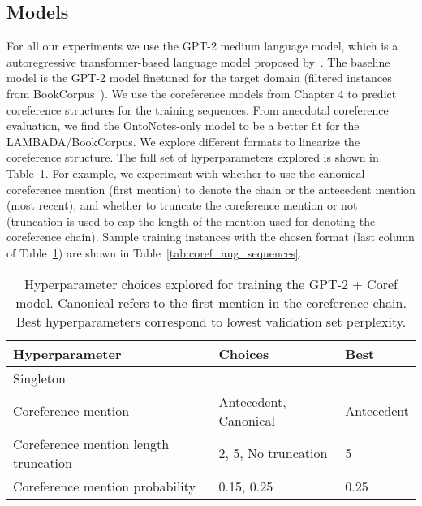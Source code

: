 \documentclass[12pt]{thesis-umich}[thesis]
\newcommand{\cmark}{\ding{51}}\newcommand{\xmark}{\ding{55}}
\begin{document}
\subsection{Models}
For all our experiments we use the GPT-2 medium language model, which is a autoregressive transformer-based language model proposed by~\citet{radford2019language}. The baseline model is the GPT-2 model finetuned for the target domain (filtered instances from BookCorpus~\cite{Zhu2015AligningBA}).  We use the coreference models from Chapter 4 to predict coreference structures for the training sequences. From anecdotal coreference evaluation, we find the OntoNotes-only model to be a better fit for the LAMBADA/BookCorpus. We explore different formats to linearize the coreference structure. 
The full set of hyperparameters explored is shown in Table~\ref{tab:lambada_hyperparam}. 
For example, we experiment with whether to use the canonical coreference mention (first mention) to denote the chain or the antecedent mention (most recent), and whether to truncate the coreference mention or not (truncation is used to cap the length of the mention used for denoting the coreference chain). 
Sample training instances with the chosen format (last column of Table~\ref{tab:lambada_hyperparam}) are shown in Table~\ref{tab:coref_aug_sequences}. 



\begin{table}[t]
    \centering
    \begin{tabular}{l l l }
    \toprule
    \textbf{Hyperparameter} & \textbf{Choices} & \textbf{Best} \\\midrule 
    Singleton & \cmark \xmark & \xmark \\
    Coreference mention & Antecedent, Canonical  & Antecedent \\
    Coreference mention length truncation  & 2, 5, No truncation & 5 \\
    Coreference mention probability & 0.15, 0.25 & 0.25 \\
    \bottomrule
    \end{tabular}
    \caption{Hyperparameter choices explored for training the GPT-2 + Coref model. Canonical refers to the first mention in the coreference chain. Best hyperparameters correspond to lowest validation set perplexity. }
    \label{tab:lambada_hyperparam}
\end{table}
\end{document}
